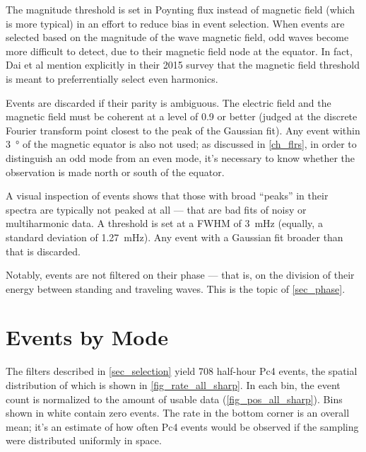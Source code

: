The magnitude threshold is set in Poynting flux instead of magnetic field
(which is more typical) in an effort to reduce bias in event selection. When
events are selected based on the magnitude of the wave magnetic field, odd
waves become more difficult to detect, due to their magnetic field node at the
equator. In fact, Dai et al mention explicitly in their 2015 survey that the
magnetic field threshold is meant to preferrentially select even
harmonics\cite{dai_2015}. 

Events are discarded if their parity is ambiguous. The electric field and the
magnetic field must be coherent at a level of 0.9 or better (judged at the
discrete Fourier transform point closest to the peak of the Gaussian fit). Any
event within \SI{3}{\degree} of the magnetic equator is also not used; as
discussed in \cref{ch_flrs}, in order to distinguish an odd mode from an even
mode, it's necessary to know whether the observation is made north or south of
the equator. 


A visual inspection of events shows that those with broad ``peaks'' in their
spectra are typically not peaked at all --- that are bad fits of noisy or
multiharmonic data. A
threshold is set at a FWHM of \SI{3}{\mHz} (equally, a standard deviation of
\SI{1.27}{\mHz}). Any event with a Gaussian fit broader than that is discarded.

Notably, events are not filtered on their phase --- that is, on the division of
their energy between standing and traveling waves. This is the topic of
\cref{sec_phase}. 


\section{Events by Mode}
  \label{sec_rate}

The filters described in \cref{sec_selection} yield 708 half-hour Pc4 events,
the spatial
distribution of which is shown in \cref{fig_rate_all_sharp}. In each bin, the
event count is normalized to the amount of usable data
(\cref{fig_pos_all_sharp}). Bins shown in white contain zero events. The rate
in the bottom corner is an overall mean; it's an estimate of how often Pc4
events would be observed if the sampling were distributed uniformly in space.

